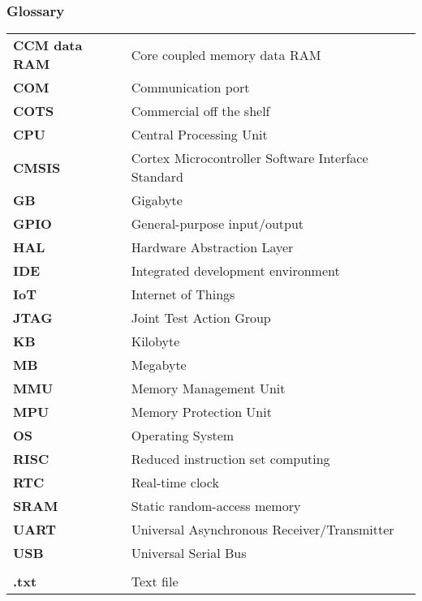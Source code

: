 \subsubsection*{Glossary}
\begin{longtable}{l p{12cm}}
\textbf{CCM data RAM}	& \qquad \qquad Core coupled memory data RAM\\
\textbf{COM}		& \qquad \qquad Communication port\\
\textbf{COTS}		& \qquad \qquad Commercial off the shelf\\
\textbf{CPU}		& \qquad \qquad Central Processing Unit\\
\textbf{CMSIS}		& \qquad \qquad Cortex Microcontroller Software Interface Standard\\
\textbf{GB}			& \qquad \qquad Gigabyte\\
\textbf{GPIO}		& \qquad \qquad General-purpose input/output\\
\textbf{HAL}		& \qquad \qquad Hardware Abstraction Layer\\
\textbf{IDE}		& \qquad \qquad Integrated development environment\\
\textbf{IoT}		& \qquad \qquad Internet of Things\\
\textbf{JTAG}		& \qquad \qquad Joint Test Action Group\\
\textbf{KB}			& \qquad \qquad Kilobyte\\
\textbf{MB}			& \qquad \qquad Megabyte\\
\textbf{MMU}		& \qquad \qquad Memory Management Unit\\
\textbf{MPU}		& \qquad \qquad Memory Protection Unit\\
\textbf{OS}			& \qquad \qquad Operating System\\
\textbf{RISC}		& \qquad \qquad Reduced instruction set computing\\
\textbf{RTC}		& \qquad \qquad Real-time clock\\
\textbf{SRAM}		& \qquad \qquad Static random-access memory\\
\textbf{UART}		& \qquad \qquad Universal Asynchronous Receiver/Transmitter\\
\textbf{USB}		& \qquad \qquad Universal Serial Bus\\
					& \\
\textbf{.txt}		& \qquad \qquad Text file\\

\end{longtable}
